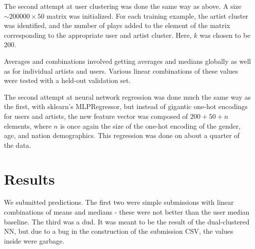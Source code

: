 \documentclass[11pt]{article}
\begin{document}
The second attempt at user clustering was done the same way as above. A size $\sim 200000 \times 50$ matrix was initialized. For each training example, the artist cluster was identified, and the number of plays added to the element of the matrix corresponding to the appropriate user and artist cluster. Here, $k$ was chosen to be $200$. 

Averages and combinations involved getting averages and medians globally as well as for individual artists and users. Various linear combinations of these values were tested with a held-out validation set.

The second attempt at neural network regression was done much the same way as the first, with sklearn's MLPRegressor, but instead of gigantic one-hot encodings for users and artists, the new feature vector was composed of $200 + 50 + n$ elements, where $n$ is once again the size of the one-hot encoding of the gender, age, and nation demographics. This regression was done on about a quarter of the data.


\section{Results}

We submitted predictions. The first two were simple submissions with linear combinations of means and medians - these were not better than the user median baseline. The third was a dud. It was meant to be the result of the dual-clustered NN, but due to a bug in the construction of the submission CSV, the values inside were garbage. \\
\end{document}
